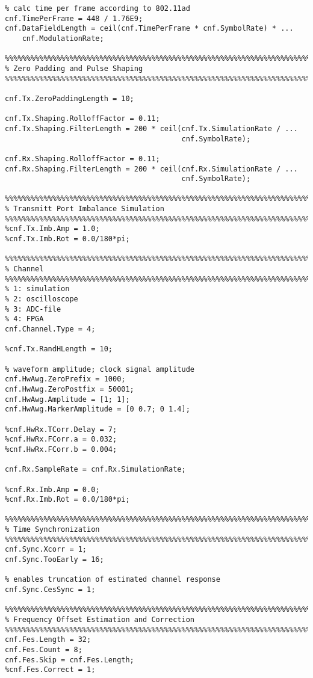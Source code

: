 \begin{appendix}
\begin{verbatim}
% calc time per frame according to 802.11ad
cnf.TimePerFrame = 448 / 1.76E9;
cnf.DataFieldLength = ceil(cnf.TimePerFrame * cnf.SymbolRate) * ...
    cnf.ModulationRate;

%%%%%%%%%%%%%%%%%%%%%%%%%%%%%%%%%%%%%%%%%%%%%%%%%%%%%%%%%%%%%%%%%%%%%%%%%%%%%%%%
% Zero Padding and Pulse Shaping
%%%%%%%%%%%%%%%%%%%%%%%%%%%%%%%%%%%%%%%%%%%%%%%%%%%%%%%%%%%%%%%%%%%%%%%%%%%%%%%%

cnf.Tx.ZeroPaddingLength = 10;

cnf.Tx.Shaping.RolloffFactor = 0.11;
cnf.Tx.Shaping.FilterLength = 200 * ceil(cnf.Tx.SimulationRate / ...
                                         cnf.SymbolRate);

cnf.Rx.Shaping.RolloffFactor = 0.11;
cnf.Rx.Shaping.FilterLength = 200 * ceil(cnf.Rx.SimulationRate / ...
                                         cnf.SymbolRate);

%%%%%%%%%%%%%%%%%%%%%%%%%%%%%%%%%%%%%%%%%%%%%%%%%%%%%%%%%%%%%%%%%%%%%%%%%%%%%%%%
% Transmitt Port Imbalance Simulation
%%%%%%%%%%%%%%%%%%%%%%%%%%%%%%%%%%%%%%%%%%%%%%%%%%%%%%%%%%%%%%%%%%%%%%%%%%%%%%%%
%cnf.Tx.Imb.Amp = 1.0;
%cnf.Tx.Imb.Rot = 0.0/180*pi;

%%%%%%%%%%%%%%%%%%%%%%%%%%%%%%%%%%%%%%%%%%%%%%%%%%%%%%%%%%%%%%%%%%%%%%%%%%%%%%%%
% Channel
%%%%%%%%%%%%%%%%%%%%%%%%%%%%%%%%%%%%%%%%%%%%%%%%%%%%%%%%%%%%%%%%%%%%%%%%%%%%%%%%
% 1: simulation
% 2: oscilloscope
% 3: ADC-file
% 4: FPGA
cnf.Channel.Type = 4;

%cnf.Tx.RandHLength = 10;

% waveform amplitude; clock signal amplitude
cnf.HwAwg.ZeroPrefix = 1000;
cnf.HwAwg.ZeroPostfix = 50001;
cnf.HwAwg.Amplitude = [1; 1];
cnf.HwAwg.MarkerAmplitude = [0 0.7; 0 1.4];

%cnf.HwRx.TCorr.Delay = 7;
%cnf.HwRx.FCorr.a = 0.032;
%cnf.HwRx.FCorr.b = 0.004;

cnf.Rx.SampleRate = cnf.Rx.SimulationRate;

%cnf.Rx.Imb.Amp = 0.0;
%cnf.Rx.Imb.Rot = 0.0/180*pi;

%%%%%%%%%%%%%%%%%%%%%%%%%%%%%%%%%%%%%%%%%%%%%%%%%%%%%%%%%%%%%%%%%%%%%%%%%%%%%%%%
% Time Synchronization
%%%%%%%%%%%%%%%%%%%%%%%%%%%%%%%%%%%%%%%%%%%%%%%%%%%%%%%%%%%%%%%%%%%%%%%%%%%%%%%%
cnf.Sync.Xcorr = 1;
cnf.Sync.TooEarly = 16;

% enables truncation of estimated channel response
cnf.Sync.CesSync = 1;

%%%%%%%%%%%%%%%%%%%%%%%%%%%%%%%%%%%%%%%%%%%%%%%%%%%%%%%%%%%%%%%%%%%%%%%%%%%%%%%%
% Frequency Offset Estimation and Correction
%%%%%%%%%%%%%%%%%%%%%%%%%%%%%%%%%%%%%%%%%%%%%%%%%%%%%%%%%%%%%%%%%%%%%%%%%%%%%%%%
cnf.Fes.Length = 32;
cnf.Fes.Count = 8;
cnf.Fes.Skip = cnf.Fes.Length;
%cnf.Fes.Correct = 1;


\end{verbatim}
\end{appendix}
